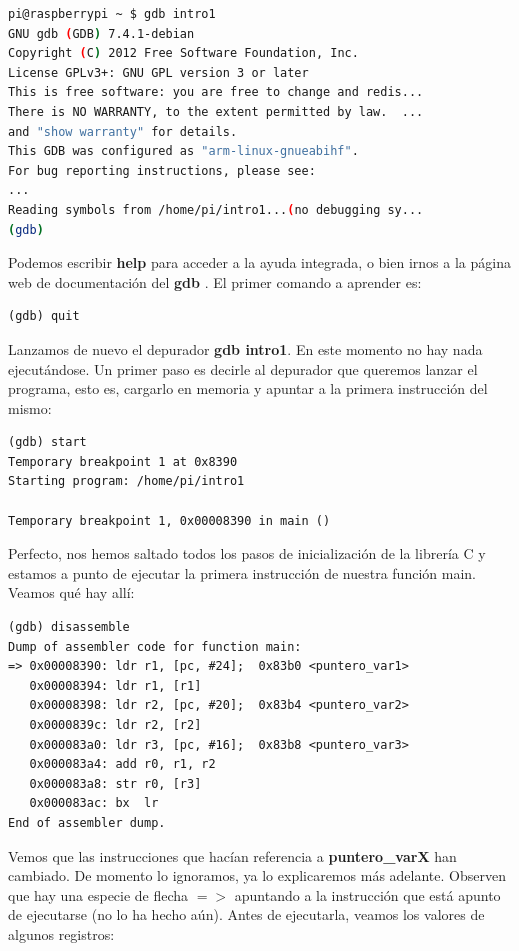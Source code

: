 \begin{lstlisting}[language=bash]
pi@raspberrypi ~ $ gdb intro1
GNU gdb (GDB) 7.4.1-debian
Copyright (C) 2012 Free Software Foundation, Inc.
License GPLv3+: GNU GPL version 3 or later 
This is free software: you are free to change and redis...
There is NO WARRANTY, to the extent permitted by law.  ...
and "show warranty" for details.
This GDB was configured as "arm-linux-gnueabihf".
For bug reporting instructions, please see:
...
Reading symbols from /home/pi/intro1...(no debugging sy...
(gdb)
\end{lstlisting}

Podemos escribir {\bf help} para acceder a la ayuda integrada, o bien
irnos a la página web de documentación del {\bf gdb} \cite{DGDB}.
El primer comando a aprender es:

\begin{lstlisting}
(gdb) quit
\end{lstlisting}

Lanzamos de nuevo el depurador {\bf gdb intro1}. En este momento no hay
nada ejecutándose. Un primer paso es decirle al depurador que queremos
lanzar el programa, esto es, cargarlo en memoria y apuntar a la primera
instrucción del mismo:

\begin{lstlisting}
(gdb) start
Temporary breakpoint 1 at 0x8390
Starting program: /home/pi/intro1
 
Temporary breakpoint 1, 0x00008390 in main ()
\end{lstlisting}

Perfecto, nos hemos saltado todos los pasos de inicialización de la
librería C y estamos a punto de ejecutar la primera instrucción de
nuestra función main. Veamos qué hay allí:

\begin{lstlisting}
(gdb) disassemble
Dump of assembler code for function main:
=> 0x00008390: ldr r1, [pc, #24];  0x83b0 <puntero_var1>
   0x00008394: ldr r1, [r1]
   0x00008398: ldr r2, [pc, #20];  0x83b4 <puntero_var2>
   0x0000839c: ldr r2, [r2]
   0x000083a0: ldr r3, [pc, #16];  0x83b8 <puntero_var3>
   0x000083a4: add r0, r1, r2
   0x000083a8: str r0, [r3]
   0x000083ac: bx  lr
End of assembler dump.
\end{lstlisting}

Vemos que las instrucciones que hacían referencia a {\bf puntero\_varX}
han cambiado. De momento lo ignoramos, ya lo explicaremos más adelante.
Observen que hay una especie de flecha {\bf $=>$} apuntando a la
instrucción que está apunto de ejecutarse (no lo ha hecho aún).
Antes de ejecutarla, veamos los valores de algunos registros:

